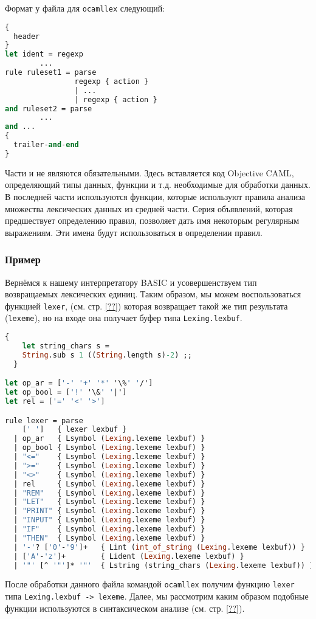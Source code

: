 Формат у файла для \texttt{ocamllex} следующий:

\begin{lstlisting}[language=OCaml]
{
  header
}
let ident = regexp
        ...
rule ruleset1 = parse
                regexp { action }
                | ...
                | regexp { action }
and ruleset2 = parse
        ...
and ...
{
  trailer-and-end
}
\end{lstlisting}

Части  и  не являются обязательными.
Здесь вставляется код Objective CAML, определяющий типы данных, функции и т.д.
необходимые для обработки данных. В последней части используются функции,
которые используют правила анализа множества лексических данных из средней
части. Серия объявлений, которая предшествует определению правил, позволяет дать
имя некоторым регулярным выражениям. Эти имена будут использоваться в
определении правил.

\subsubsection{Пример}

Вернёмся к нашему интерпретатору BASIC и усовершенствуем тип возвращаемых
лексических единиц. Таким образом, мы можем воспользоваться функцией
\texttt{lexer}, (см. стр.  \ref{??}) которая возвращает такой же тип результата
(\texttt{lexeme}), но на входе она получает буфер типа \texttt{Lexing.lexbuf}.

\begin{lstlisting}[language=OCaml]
  {
    let string_chars s =
    String.sub s 1 ((String.length s)-2) ;;
  }

let op_ar = ['-' '+' '*' '\%' '/']
let op_bool = ['!' '\&' '|']
let rel = ['=' '<' '>']

rule lexer = parse
    [' ']   { lexer lexbuf }
  | op_ar   { Lsymbol (Lexing.lexeme lexbuf) }
  | op_bool { Lsymbol (Lexing.lexeme lexbuf) }
  | "<="    { Lsymbol (Lexing.lexeme lexbuf) }
  | ">="    { Lsymbol (Lexing.lexeme lexbuf) }
  | "<>"    { Lsymbol (Lexing.lexeme lexbuf) }
  | rel     { Lsymbol (Lexing.lexeme lexbuf) }
  | "REM"   { Lsymbol (Lexing.lexeme lexbuf) }
  | "LET"   { Lsymbol (Lexing.lexeme lexbuf) }
  | "PRINT" { Lsymbol (Lexing.lexeme lexbuf) }
  | "INPUT" { Lsymbol (Lexing.lexeme lexbuf) }
  | "IF"    { Lsymbol (Lexing.lexeme lexbuf) }
  | "THEN"  { Lsymbol (Lexing.lexeme lexbuf) }
  | '-'? ['0'-'9']+   { Lint (int_of_string (Lexing.lexeme lexbuf)) }
  | ['A'-'z']+        { Lident (Lexing.lexeme lexbuf) }
  | '"' [^ '"']* '"'  { Lstring (string_chars (Lexing.lexeme lexbuf)) }
\end{lstlisting}

После обработки данного файла командой \texttt{ocamllex} получим функцию
\texttt{lexer} типа \texttt{Lexing.lexbuf -> lexeme}. Далее, мы рассмотрим каким
образом подобные функции используются в синтаксическом анализе (см. стр.
\ref{??}).
